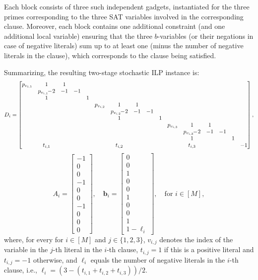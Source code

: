 \documentclass{theoretics}
\newcommand{\tup}[1]{{\mathbf{#1}}}
\newcommand{\bb}{\tup b}
\begin{document}
Each block consists of three such independent gadgets, instantiated for the three primes corresponding to the three SAT variables involved in the corresponding clause. Moreover, each block contains one additional constraint (and one additional local variable) ensuring that the three $b$-variables (or their negations in case of negative literals) sum up to at least one (minus the number of negative literals in the clause), which corresponds to the clause being satisfied.

Summarizing, the resulting two-stage stochastic ILP instance is:
\[\setcounter{MaxMatrixCols}{20}
D_i = \begin{bmatrix}
p_{v_{i,1}} & 1 & 1 & & &   &&&&&   &&&&& \\
& p_{v_{i,1}}\!\!-\!2 & -1 & -1 & & &&&&& &&&&& \\
& 1 & & & 1 & &&&&& \\
&&&&& p_{v_{i,2}} & 1 & 1 & & & &&&&& \\
&&&&& & p_{v_{i,2}}\!\!-\!2 & -1 & -1 & & &&&&& \\
&&&&& & 1 & & & 1 & &&&&& \\
&&&&& &&&&& p_{v_{i,3}} & 1 & 1 & & & \\
&&&&& &&&&& & p_{v_{i,3}}\!\!-\!2 & -1 & -1 & & \\
&&&&& &&&&& & 1 & & & 1 & \\
&t_{i,1}&&&& &t_{i,2}&&&& &t_{i,3}&&&& -1 \\
\end{bmatrix},
\]
\[
A_i = \begin{bmatrix} -1 \\ 0 \\ 0 \\ -1 \\ 0 \\ 0 \\ -1 \\ 0 \\ 0 \\ 0 \end{bmatrix}, \quad
\bb_i = \begin{bmatrix} 0 \\ 0 \\ 1 \\ 0 \\ 0 \\ 1 \\ 0 \\ 0 \\ 1 \\ 1 - \ell_i\end{bmatrix}, \quad
\text{for } i \in [M],
\]
where, for every for $i \in [M]$ and $j \in \{1,2,3\}$, $v_{i,j}$ denotes the index of the variable in the $j$-th literal in the $i$-th clause, $t_{i,j}=1$ if this is a positive literal and $t_{i,j}=-1$ otherwise, and $\ell_i$ equals the number of negative literals in the $i$-th clause, i.e., $\ell_i = (3-(t_{i,1}+t_{i,2}+t_{i,3}))/2$.
\end{document}
